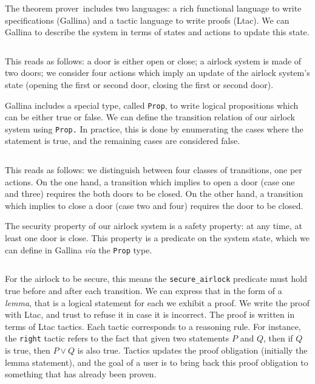\begin{example}
  The  theorem prover\,\cite{coq} includes two languages: a rich
  functional language to write specifications ({\sc Gallina}) and a tactic
  language to write proofs ({\sc Ltac}).
  We can {\sc Gallina} to describe the system in terms of states and actions to
  update this state.

  \inputminted[firstline=1,lastline=14]{coq}{Listings/Airlock.v}

  This reads as follows: a door is either open or close; a airlock system is
  made of two doors; we consider four actions which imply an update of the
  airlock system's state (opening the first or second door, closing the first or
  second door).

  {\sc Gallina} includes a special type, called \texttt{Prop}, to write logical
  propositions which can be either true or false.
  We can define the transition relation of our airlock system using
  \texttt{Prop.}
  In practice, this is done by enumerating the cases where the statement is
  true, and the remaining cases are considered false.

  \inputminted[firstline=16,lastline=33]{coq}{Listings/Airlock.v}

  This reads as follows: we distinguish between four classes of transitions, one
  per actions.
  On the one hand, a transition which implies to open a door (case one and
  three) requires the both doors to be closed.
  On the other hand, a transition which implies to close a door (case two and
  four) requires the door to be closed.

  The security property of our airlock system is a safety property: at any time,
  at least one door is close.
  This property is a predicate on the system state, which we can define in {\sc
    Gallina} \emph{via} the \texttt{Prop} type.

  \inputminted[firstline=35,lastline=38]{coq}{Listings/Airlock.v}

  For the airlock to be secure, this means the \texttt{secure\_airlock}
  predicate must hold true before and after each transition.
  We can express that in the form of a \emph{lemma}, that is a logical statement
  for each we exhibit a proof.
  We write the proof with {\sc Ltac}, and trust  to refuse it in case
  it is incorrect.
  The proof is written in terms of {\sc Ltac} tactics.
  Each tactic corresponds to a reasoning rule.
  For instance, the \texttt{right} tactic refers to the fact that given two
  statements $P$ and $Q$, then if $Q$ is true, then $P \vee Q$ is also
  true. Tactics updates the proof obligation (initially the lemma statement),
  and the goal of a  user is to bring back this proof obligation to
  something that has already been proven.


\end{example}
